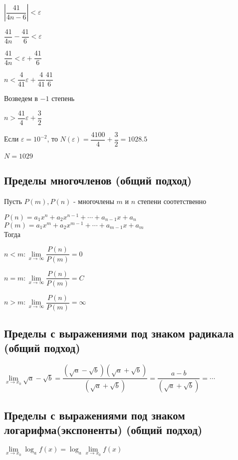 $ \left|  \dfrac{41}{4n - 6} \right| < \varepsilon $

$ \dfrac{41}{4n} - \dfrac{41}{6}  < \varepsilon $

$ \dfrac{41}{4n} < \varepsilon + \dfrac{41}{6}$

$ n < \dfrac{4}{41}\varepsilon + \dfrac{4}{41}\dfrac{41}{6}$

Возведем в $ -1 $ степень

$ n > \dfrac{41}{4}\varepsilon + \dfrac{3}{2}$

Если $ \varepsilon = 10^{-2} $, то $ N(\varepsilon) = \dfrac{4100}{4} + \dfrac{3}{2} = 1028.5 $

$ N = 1029 $

\subsection{Пределы многочленов (общий подход)}

Пусть $ P(m), P(n) $ - многочлены $ m $ и $ n $ степени соотетственно

$P(n)=a_1 x^n + a_2 x^{n-1} + \cdots + a_{n-1}x +  a_{n}$ \\

$P(m)=a_1 x^m + a_2 x^{m-1} + \cdots + a_{m-1}x +  a_{m}$ \\

Тогда

$n < m: \lim\limits_{x\to \infty} \dfrac{P(n)}{P(m)} = 0 $

$n = m: \lim\limits_{x\to \infty} \dfrac{P(n)}{P(m)} = C $

$n > m: \lim\limits_{x\to \infty} \dfrac{P(n)}{P(m)} = \infty $

\subsection{Пределы с выражениями под знаком радикала (общий подход)}

$\lim\limits_{x\to x_0} \sqrt{a} - \sqrt{b} = 
\dfrac{(\sqrt{a} - \sqrt{b})(\sqrt{a} + \sqrt{b})}{(\sqrt{a} + \sqrt{b})} =
\dfrac{a - b}{(\sqrt{a} + \sqrt{b})}  = \cdots $

\subsection{Пределы с выражениями под знаком логарифма(экспоненты) (общий подход)}

$ \lim\limits_{x\to x_0} \log_a{f(x)} =  \log_a {\lim\limits_{x\to x_0} {f(x)} }  $


